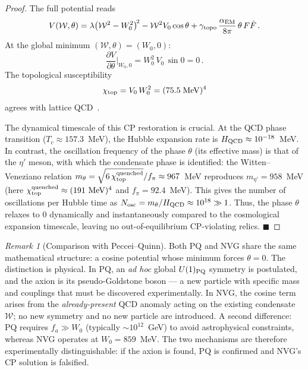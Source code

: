 \documentclass[12pt,a4paper]{article}
\theoremstyle{plain}
\theoremstyle{definition}
\theoremstyle{remark}
\newtheorem*{remark}{Remark}
\newcommand{\Wc}{\mathcal{W}}
\newcommand{\QED}{\hfill$\blacksquare$}
\begin{document}
\begin{proof}
The full potential reads
\begin{equation}\label{eq:potential}
  V(\Wc,\theta) = \lambda\bigl(\Wc^2 - W_0^2\bigr)^{\!2}
  - \Wc^2 V_0\cos\theta
  + \gamma_{\rm topo}\,\frac{\alpha_{\rm EM}}{8\pi}\,
    \theta\, F\tilde{F}\,.
\end{equation}
At the global minimum $(\Wc,\theta) = (W_0, 0)$:
\begin{equation}
  \frac{\partial V}{\partial\theta}\bigg|_{W_0,0}
  = W_0^2\, V_0\,\sin 0 = 0\,.
\end{equation}
The topological susceptibility
\begin{equation}
  \chi_{\rm top} = V_0\, W_0^2
  = (75.5\;\mathrm{MeV})^4
\end{equation}
agrees with lattice QCD~\cite{Borsanyi2016}.

The dynamical timescale of this CP restoration is crucial. At the QCD phase transition ($T_c \approx 157.3$~MeV), the Hubble expansion rate is $H_{\rm QCD} \approx 10^{-18}$~MeV. In contrast, the oscillation frequency of the phase $\theta$ (its effective mass) is that of the $\eta'$ meson, with which the condensate phase is identified: the Witten--Veneziano relation $m_\theta = \sqrt{6\,\chi_{\rm top}^{\rm quenched}}/f_\pi \approx 967$~MeV reproduces $m_{\eta'} = 958$~MeV (here $\chi_{\rm top}^{\rm quenched} \approx (191~\text{MeV})^4$ and $f_\pi = 92.4$~MeV). This gives the number of oscillations per Hubble time as $N_{\rm osc} = m_\theta/H_{\rm QCD} \approx 10^{18} \gg 1$. Thus, the phase $\theta$ relaxes to 0 dynamically and instantaneously compared to the cosmological expansion timescale, leaving no out-of-equilibrium CP-violating relics.
\QED
\end{proof}

\begin{remark}[Comparison with Peccei--Quinn]
Both PQ and NVG share the same mathematical structure:
a cosine potential whose minimum forces $\theta = 0$.
The distinction is physical.  In PQ, an \emph{ad hoc}
global $U(1)_{\rm PQ}$ symmetry is postulated, and the
axion is its pseudo-Goldstone boson — a new particle with
specific mass and couplings that must be discovered
experimentally.  In NVG, the cosine term arises from the
\emph{already-present} QCD anomaly acting on the existing
condensate $\Wc$; no new symmetry and no new particle are
introduced.  A second difference: PQ requires
$f_a \gg W_0$ (typically $\sim 10^{12}$~GeV) to avoid
astrophysical constraints, whereas NVG operates at
$W_0 = 859$~MeV.  The two mechanisms are therefore
experimentally distinguishable: if the axion is found,
PQ is confirmed and NVG's CP solution is falsified.
\end{remark}
\end{document}

